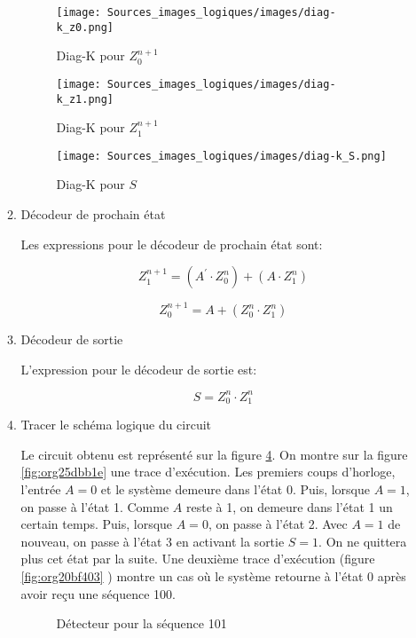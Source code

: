 \documentclass[letter, oneside]{book}
\begin{document}
\begin{enumerate}
\begin{enumerate}
\begin{figure}[htbp]
\centering
\texttt{[image: Sources\_images\_logiques/images/diag-k\_z0.png]}
\caption{\label{fig:org13e0381}Diag-K pour \(Z_0^{n+1}\)}
\end{figure}

\begin{figure}[htbp]
\centering
\texttt{[image: Sources\_images\_logiques/images/diag-k\_z1.png]}
\caption{\label{fig:org477d53a}Diag-K pour \(Z_1^{n+1}\)}
\end{figure}

\begin{figure}[htbp]
\centering
\texttt{[image: Sources\_images\_logiques/images/diag-k\_S.png]}
\caption{\label{fig:orgd9fa63d}Diag-K pour \(S\)}
\end{figure}

\item Décodeur de prochain état
\label{sec:orga0f4be5}

Les expressions pour le décodeur de prochain état sont:

$$Z_1^{n+1} = (A^\prime \cdot Z_0^{n}) + (A \cdot  Z_1^{n})$$

$$Z_0^{n+1} = A + (Z_0^{n} \cdot Z_1^{n})$$

\item Décodeur de sortie
\label{sec:org45c9315}

L'expression pour le décodeur de sortie est:

$$S = Z_0^{n} \cdot Z_1^{n}$$

\item Tracer le schéma logique du circuit
\label{sec:org3efdeee}

Le circuit obtenu est représenté sur la figure
\ref{fig:org6d30019}. On montre sur la figure
\ref{fig:org25dbb1e} une trace d'exécution. Les premiers coups
d'horloge, l'entrée \(A=0\) et le système demeure dans l'état 0. Puis,
lorsque \(A=1\), on passe à l'état 1. Comme \(A\) reste à 1, on
demeure dans l'état 1 un certain temps. Puis, lorsque \(A=0\), on
passe à l'état 2. Avec \(A=1\) de nouveau, on passe à l'état 3 en
activant la sortie \(S=1\). On ne quittera plus cet état par la
suite. Une deuxième trace d'exécution (figure \ref{fig:org20bf403}
) montre un cas où le système retourne à l'état 0 après avoir reçu une
séquence 100.

\begin{figure}[htbp]
\centering

\caption{\label{fig:org6d30019}Détecteur pour la séquence 101}
\end{figure}


\end{enumerate}
\end{enumerate}
\end{document}
